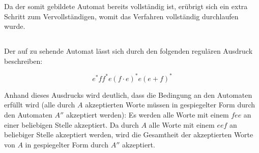 \documentclass[10pt,a4paper,oneside,ngerman,numbers=noenddot]{scrartcl}
\begin{document}
	Da der somit gebildete Automat bereits vollständig ist, erübrigt sich ein extra Schritt zum Vervollständigen, womit das Verfahren vollständig durchlaufen wurde.
	\subsection{}
	Der auf  zu sehende Automat lässt sich durch den folgenden regulären Ausdruck beschreiben:
	
	\[e^{*}ff^{*}e(f \cdot e)^{*}e(e + f)^{*}\]
	
	Anhand dieses Ausdrucks wird deutlich, dass die Bedingung an den Automaten erfüllt wird (alle durch \(A\) akzeptierten Worte müssen in gespiegelter Form durch den Automaten \(A''\) akzeptiert werden): Es werden alle Worte mit einem \(fee\) an einer beliebigen Stelle akzeptiert. Da durch \(A\) alle Worte mit einem \(eef\) an beliebiger Stelle akzeptiert werden, wird die Gesamtheit der akzeptierten Worte von \(A\) in gespiegelter Form durch \(A''\) akzeptiert.
\end{document}
